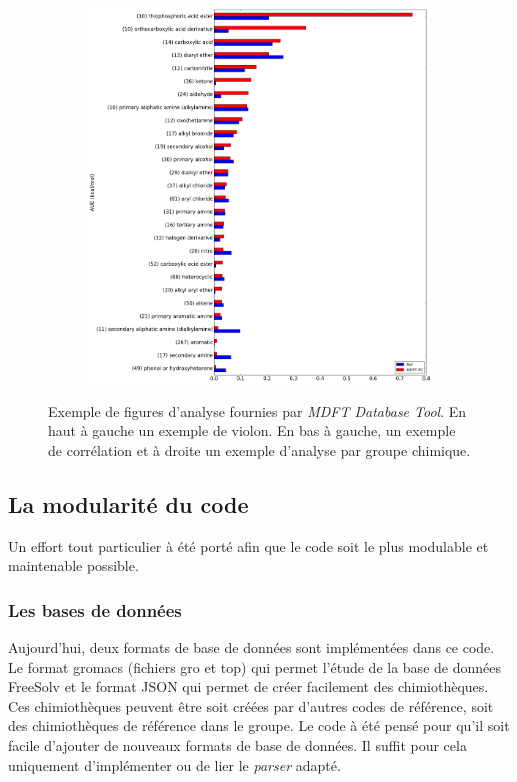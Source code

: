 \begin{figure}[h]
\begin{subfigure}[b]{0.40\textwidth}
   \end{subfigure}
   \hspace{5mm}
   \begin{subfigure}[b]{0.59\textwidth}
         \includegraphics[width=\textwidth]{chapters/BDD/images/freesolv_1/PC_error_by_groups.png}
    \end{subfigure}
  \caption[Exemple de figures d'analyse fournies par \textit{MDFT Database Tool}.]{Exemple de figures d'analyse fournies par \textit{MDFT Database Tool}. En haut à gauche un exemple de violon. En bas à gauche, un exemple de corrélation et à droite un exemple d'analyse par groupe chimique.}
  \label{fig:examples}
\end{figure}


\subsection{La modularité du code}
Un effort tout particulier à été porté afin que le code soit le plus modulable et maintenable possible. 

\subsubsection{Les bases de données}
Aujourd'hui, deux formats de base de données sont implémentées dans ce code. Le format gromacs (fichiers gro et top) qui permet l'étude de la base de données FreeSolv et le format JSON qui permet de créer facilement des chimiothèques. Ces chimiothèques peuvent être soit créées par d'autres codes de référence, soit des chimiothèques de référence dans le groupe. Le code à été pensé pour qu'il soit facile d'ajouter de nouveaux formats de base de données. Il suffit pour cela uniquement d'implémenter ou de lier le \textit{parser} adapté.

